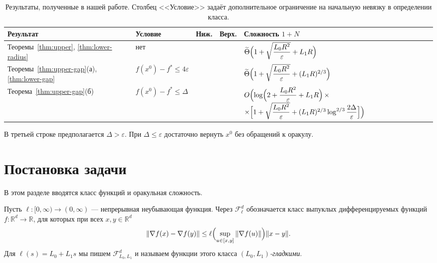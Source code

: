 \documentclass[11pt,a4paper]{article}
\newcommand{\R}{\mathbb R}
\newcommand{\F}{\mathcal F}
\newcommand{\norm}[1]{\|#1\|}
\newcommand{\yes}{\textcolor{green!55!black}{\ding{51}}}
\newcommand{\no}{\textcolor{red!80!black}{\ding{55}}}
\begin{document}
\begin{table}[ht]
\centering\small
\caption{Результаты, полученные в нашей работе. Столбец <<Условие>> задаёт дополнительное ограничение на начальную невязку в определении класса.}
\label{tab:results}
\begin{tabularx}{\linewidth}{@{}P{.2\linewidth}lccY@{}}
\toprule
Результат & Условие & Ниж. & Верх. & Сложность $1+N$\\
\midrule
Теоремы~\ref{thm:upper}, \ref{thm:lower-radius} & нет & \yes & \yes & $\widetilde\Theta\Bigl(1+\sqrt{\dfrac{L_0R^2}\varepsilon}+L_1R\Bigr)$\\[3mm]
Теоремы~\ref{thm:upper-gap}(а), \ref{thm:lower-gap} & $f(x^0)-f^\ast\le4\varepsilon$ & \yes & \yes & $\widetilde\Theta\Bigl(1+\sqrt{\dfrac{L_0R^2}\varepsilon}+(L_1R)^{2/3}\Bigr)$\\[3mm]
Теорема~\ref{thm:upper-gap}(б) & $f(x^0)-f^\ast\le\Delta$ & \no & \yes & $O\Bigl(\log\Bigl(2+\dfrac{L_0R^2}\varepsilon+L_1R\Bigr)\,\times$\newline$\times\Bigl[1+\sqrt{\dfrac{L_0R^2}\varepsilon}+(L_1R)^{2/3}\log^{2/3}\dfrac{2\Delta}\varepsilon\Bigr]\Bigr)$\\
\bottomrule
\end{tabularx}
\par\smallskip\raggedright\footnotesize
В третьей строке предполагается $\Delta>\varepsilon$. При $\Delta\le\varepsilon$ достаточно вернуть $x^0$ без обращений к оракулу.
\end{table}

\section{Постановка задачи}\label{sec:setting}

В этом разделе вводятся класс функций и оракульная сложность.

\begin{definition}\label{def:class}
Пусть $\ell:[0,\infty)\to(0,\infty)$ --- непрерывная неубывающая функция. Через $\F_\ell^d$ обозначается класс выпуклых дифференцируемых функций $f:\R^d\to\R$, для которых при всех $x,y\in\R^d$
\begin{equation}\label{eq:class}
 \norm{\nabla f(x)-\nabla f(y)}
 \le\ell\Bigl(\sup_{u\in[x,y]}\norm{\nabla f(u)}\Bigr)\norm{x-y} .
\end{equation}
Для $\ell(s)=L_0+L_1s$ мы пишем $\F_{L_0,L_1}^d$ и называем функции этого класса \emph{$(L_0,L_1)$-гладкими}.
\end{definition}
\end{document}
